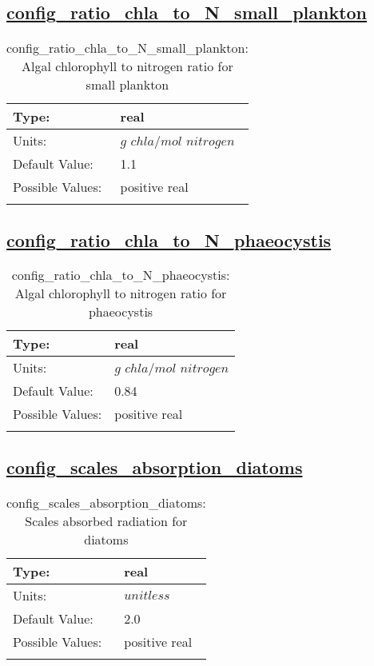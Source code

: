 \subsection[config\_ratio\_chla\_to\_N\_small\_plankton]{\hyperref[sec:nm_tab_biogeochemistry]{config\_ratio\_chla\_to\_N\_small\_plankton}}
\label{subsec:nm_sec_config_ratio_chla_to_N_small_plankton}
\begin{center}
\begin{longtable}{| p{2.0in} || p{4.0in} |}
    \hline
    Type: & real \\
    \hline
    Units: & $g$ $chla/mol$ $nitrogen$ \\
    \hline
    Default Value: & 1.1 \\
    \hline
    Possible Values: & positive real \\
    \hline
    \caption{config\_ratio\_chla\_to\_N\_small\_plankton: Algal chlorophyll to nitrogen ratio for small plankton}
\end{longtable}
\end{center}
\subsection[config\_ratio\_chla\_to\_N\_phaeocystis]{\hyperref[sec:nm_tab_biogeochemistry]{config\_ratio\_chla\_to\_N\_phaeocystis}}
\label{subsec:nm_sec_config_ratio_chla_to_N_phaeocystis}
\begin{center}
\begin{longtable}{| p{2.0in} || p{4.0in} |}
    \hline
    Type: & real \\
    \hline
    Units: & $g$ $chla/mol$ $nitrogen$ \\
    \hline
    Default Value: & 0.84 \\
    \hline
    Possible Values: & positive real \\
    \hline
    \caption{config\_ratio\_chla\_to\_N\_phaeocystis: Algal chlorophyll to nitrogen ratio for phaeocystis}
\end{longtable}
\end{center}
\subsection[config\_scales\_absorption\_diatoms]{\hyperref[sec:nm_tab_biogeochemistry]{config\_scales\_absorption\_diatoms}}
\label{subsec:nm_sec_config_scales_absorption_diatoms}
\begin{center}
\begin{longtable}{| p{2.0in} || p{4.0in} |}
    \hline
    Type: & real \\
    \hline
    Units: & $unitless$ \\
    \hline
    Default Value: & 2.0 \\
    \hline
    Possible Values: & positive real \\
    \hline
    \caption{config\_scales\_absorption\_diatoms: Scales absorbed radiation for diatoms}
\end{longtable}
\end{center}
